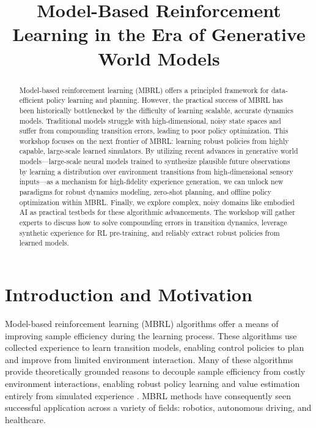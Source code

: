 \documentclass[10pt]{article} %
\title{Model-Based Reinforcement Learning in the Era of Generative World Models}
\author{}
\begin{document}
\makeCover
\maketitle



\begin{abstract}
Model-based reinforcement learning (MBRL) offers a principled framework for data-efficient policy learning and planning. However, the practical success of MBRL has been historically bottlenecked by the difficulty of learning scalable, accurate dynamics models. Traditional models struggle with high-dimensional, noisy state spaces and suffer from compounding transition errors, leading to poor policy optimization. This workshop focuses on the next frontier of MBRL: learning robust policies from highly capable, large-scale learned simulators. By utilizing recent advances in generative world models---large-scale neural models trained to synthesize plausible future observations by learning a distribution over environment transitions from high-dimensional sensory inputs---as a mechanism for high-fidelity experience generation, we can unlock new paradigms for robust dynamics modeling, zero-shot planning, and offline policy optimization within MBRL. Finally, we explore complex, noisy domains like embodied AI as practical testbeds for these algorithmic advancements. 
The workshop will gather experts to discuss how to solve compounding errors in transition dynamics, leverage synthetic experience for RL pre-training, and reliably extract robust policies from learned models.
\end{abstract}

\section{Introduction and Motivation}

Model-based reinforcement learning (MBRL) algorithms offer a means of improving sample efficiency during the learning process. These algorithms use collected experience to learn transition models, enabling control policies to plan and improve from limited environment interaction. Many of these algorithms provide theoretically grounded reasons to decouple sample efficiency from costly environment interactions, enabling robust policy learning and value estimation entirely from simulated experience \citep{ha2018world, dyna}. MBRL methods have consequently seen successful application across a variety of fields: robotics, autonomous driving, and healthcare.
\end{document}
